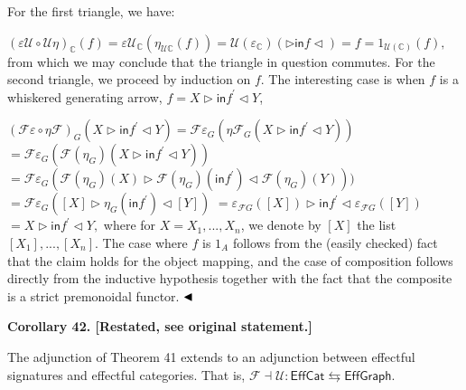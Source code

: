 For the first triangle, we have:\par
    $\displaystyle(\varepsilon\mathcal{U}\circ\mathcal{U}\eta)_{\mathbb{C}}(f)=\varepsilon\mathcal{U}_{\mathbb{C}}({\eta_{\mathcal{U}\mathbb{C}}}(f))=\mathcal{U}(\varepsilon_{\mathbb{C}})(\triangleright\mathsf{in}f\triangleleft)=f=1_{\mathcal{U}(\mathbb{C})}(f),$    
from which we may conclude that the triangle in question commutes. For the second triangle, we proceed by induction on $f$. The interesting case is when $f$ is a whiskered generating arrow, $f=X\triangleright\mathsf{in}f^{\prime}\triangleleft Y$,\par
    $\displaystyle(\mathcal{F}\varepsilon\circ\eta\mathcal{F})_{G}(X\triangleright\mathsf{in}f^{\prime}\triangleleft Y)={\mathcal{F}\varepsilon_{G}}(\eta\mathcal{F}_{G}(X\triangleright\mathsf{in}f^{\prime}\triangleleft Y))$     $\displaystyle={\mathcal{F}\varepsilon_{G}}(\mathcal{F}(\eta_{G})(X\triangleright\mathsf{in}f^{\prime}\triangleleft Y))$     $\displaystyle={\mathcal{F}\varepsilon_{G}}(\mathcal{F}(\eta_{G})(X)\triangleright\mathcal{F}(\eta_{G})(\mathsf{in}f^{\prime})\triangleleft\mathcal{F}(\eta_{G})(Y)))$     $\displaystyle={\mathcal{F}\varepsilon_{G}}([X]\triangleright\eta_{G}(\mathsf{in}f^{\prime})\triangleleft[Y])$     $\displaystyle={\varepsilon_{\mathcal{F}G}}([X])\triangleright\mathsf{in}f^{\prime}\triangleleft\varepsilon_{\mathcal{F}G}([Y])$     $\displaystyle=X\triangleright\mathsf{in}f^{\prime}\triangleleft Y,$    
where for $X=X_{1},...,X_{n}$, we denote by $[X]$ the list $[X_{1}],...,[X_{n}]$. The case where $f$ is $1_{A}$ follows from the (easily checked) fact that the claim holds for the object mapping, and the case of composition follows directly from the inductive hypothesis together with the fact that the composite is a strict premonoidal functor. $\hfill\blacktriangleleft$\par
 
 
 
 
\par\medskip\noindent\textbf{Corollary 42. [Restated, see original statement.]}\par
 
 
The adjunction of Theorem 41 extends to an adjunction between effectful signatures and effectful categories. That is, $\mathscr{F}\dashv\mathscr{U}:\mathsf{EffCat}\leftrightarrows\mathsf{EffGraph}.$\par
 
